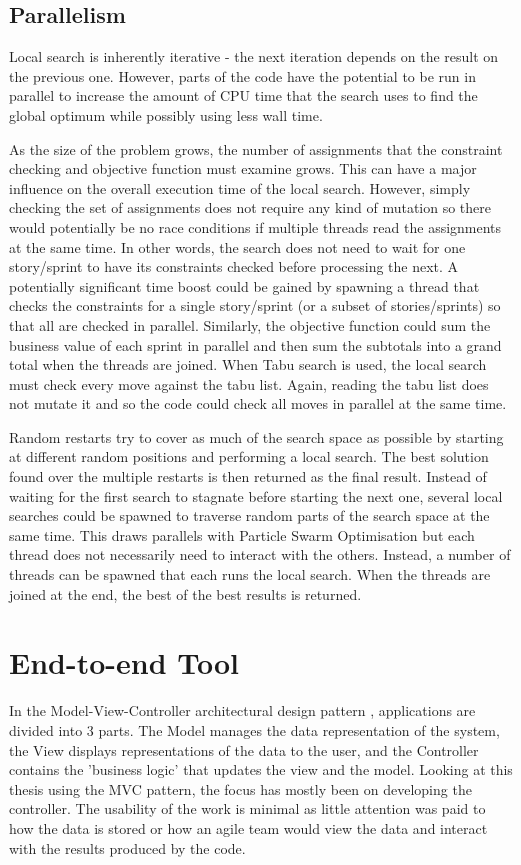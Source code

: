\subsection{Parallelism}
Local search is inherently iterative - the next iteration depends on the result on the previous one. However, parts of the code have the potential to be run in parallel to increase the amount of CPU time that the search uses to find the global optimum while possibly using less wall time.

As the size of the problem grows, the number of assignments that the constraint checking and objective function must examine grows. This can have a major influence on the overall execution time of the local search. However, simply checking the set of assignments does not require any kind of mutation so there would potentially be no race conditions if multiple threads read the assignments at the same time. In other words, the search does not need to wait for one story/sprint to have its constraints checked before processing the next. A potentially significant time boost could be gained by spawning a thread that checks the constraints for a single story/sprint (or a subset of stories/sprints) so that all are checked in parallel. Similarly, the objective function could sum the business value of each sprint in parallel and then sum the subtotals into a grand total when the threads are joined. When Tabu search is used, the local search must check every move against the tabu list. Again, reading the tabu list does not mutate it and so the code could check all moves in parallel at the same time.

Random restarts try to cover as much of the search space as possible by starting at different random positions and performing a local search. The best solution found over the multiple restarts is then returned as the final result. Instead of waiting for the first search to stagnate before starting the next one, several local searches could be spawned to traverse random parts of the search space at the same time. This draws parallels with Particle Swarm Optimisation but each thread does not necessarily need to interact with the others. Instead, a number of threads can be spawned that each runs the local search. When the threads are joined at the end, the best of the best results is returned.

\section{End-to-end Tool}
In the Model-View-Controller architectural design pattern \citep{pope1988cookbook}, applications are divided into 3 parts. The Model manages the data representation of the system, the View displays representations of the data to the user, and the Controller contains the 'business logic' that updates the view and the model. Looking at this thesis using the MVC pattern, the focus has mostly been on developing the controller. The usability of the work is minimal as little attention was paid to how the data is stored or how an agile team would view the data and interact with the results produced by the code.

